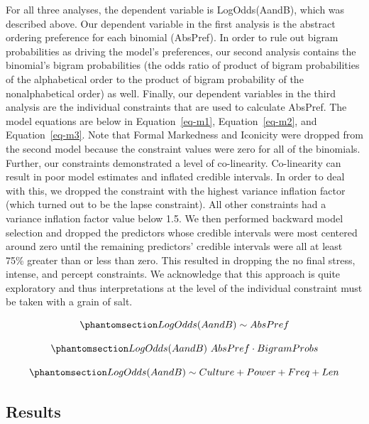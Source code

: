\documentclass[
  12pt,
  letterpaper,
]{scrreport}
\begin{document}
For all three analyses, the dependent variable is LogOdds(AandB), which
was described above. Our dependent variable in the first analysis is the
abstract ordering preference for each binomial (AbsPref). In order to
rule out bigram probabilities as driving the model's preferences, our
second analysis contains the binomial's bigram probabilities (the odds
ratio of product of bigram probabilities of the alphabetical order to
the product of bigram probability of the nonalphabetical order) as well.
Finally, our dependent variables in the third analysis are the
individual constraints that are used to calculate AbsPref. The model
equations are below in Equation~\ref{eq-m1}, Equation~\ref{eq-m2}, and
Equation~\ref{eq-m3}. Note that Formal Markedness and Iconicity were
dropped from the second model because the constraint values were zero
for all of the binomials. Further, our constraints demonstrated a level
of co-linearity. Co-linearity can result in poor model estimates and
inflated credible intervals. In order to deal with this, we dropped the
constraint with the highest variance inflation factor (which turned out
to be the lapse constraint). All other constraints had a variance
inflation factor value below 1.5. We then performed backward model
selection and dropped the predictors whose credible intervals were most
centered around zero until the remaining predictors' credible intervals
were all at least 75\% greater than or less than zero. This resulted in
dropping the no final stress, intense, and percept constraints. We
acknowledge that this approach is quite exploratory and thus
interpretations at the level of the individual constraint must be taken
with a grain of salt.

\begin{equation}\phantomsection\label{eq-m1}{
LogOdds(AandB) \sim AbsPref
}\end{equation}

\begin{equation}\phantomsection\label{eq-m2}{
LogOdds(AandB) ~ AbsPref \cdot BigramProbs
}\end{equation}

\begin{equation}\phantomsection\label{eq-m3}{
LogOdds(AandB) \sim Culture + Power + Freq + Len
}\end{equation}

\subsection{Results}\label{results-6}
\end{document}

